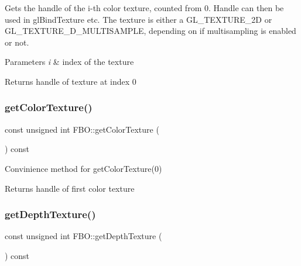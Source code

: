 Gets the handle of the i-\/th color texture, counted from 0. Handle can then be used in gl\+Bind\+Texture etc. The texture is either a G\+L\+\_\+\+T\+E\+X\+T\+U\+R\+E\+\_\+2D or G\+L\+\_\+\+T\+E\+X\+T\+U\+R\+E\+\_\+D\+\_\+\+M\+U\+L\+T\+I\+S\+A\+M\+P\+LE, depending on if multisampling is enabled or not.


\begin{DoxyParams}{Parameters}
{\em i} & index of the texture \\
\hline
\end{DoxyParams}
\begin{DoxyReturn}{Returns}
handle of texture at index 0 
\end{DoxyReturn}
\mbox{\label{class_f_b_o_a18441302a3220a0f24a69a4eea1959c0}} 
\subsubsection{\texorpdfstring{getColorTexture()}{getColorTexture()}\hspace{0.1cm}{\footnotesize\ttfamily [2/2]}}
{\footnotesize\ttfamily const unsigned int F\+B\+O\+::get\+Color\+Texture (\begin{DoxyParamCaption}{ }\end{DoxyParamCaption}) const\hspace{0.3cm}{\ttfamily [inline]}}

Convinience method for get\+Color\+Texture(0)

\begin{DoxyReturn}{Returns}
handle of first color texture 
\end{DoxyReturn}
\mbox{\label{class_f_b_o_a7463991775d4c862d55108f918b0b2f9}} 
\subsubsection{\texorpdfstring{getDepthTexture()}{getDepthTexture()}}
{\footnotesize\ttfamily const unsigned int F\+B\+O\+::get\+Depth\+Texture (\begin{DoxyParamCaption}{ }\end{DoxyParamCaption}) const\hspace{0.3cm}{\ttfamily [inline]}}

